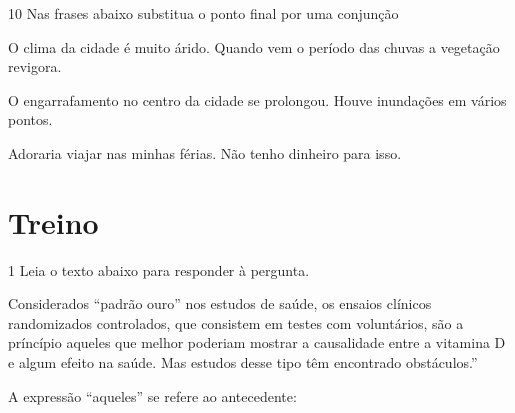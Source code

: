 {\num{10} Nas frases abaixo substitua o ponto final por uma conjunção

\begin{escolha}

  \item O clima da cidade é muito árido. Quando vem o período das chuvas a
  vegetação revigora.

\item{}
  
  \item O engarrafamento no centro da cidade se prolongou. Houve inundações em
  vários pontos.

\item{}
  
  \item Adoraria viajar nas minhas férias. Não tenho dinheiro para isso.

\item{}

\end{escolha}

\section{Treino}

\num{1} Leia o texto abaixo para responder à pergunta.

\begin{myquote}

Considerados ``padrão ouro'' nos estudos de saúde, os ensaios clínicos
randomizados controlados, que consistem em testes com voluntários, são a
príncípio aqueles que melhor poderiam mostrar a causalidade entre a
vitamina D e algum efeito na saúde. Mas estudos desse tipo têm
encontrado obstáculos.''

\end{myquote}


A expressão ``aqueles'' se refere ao antecedente:

\begin{escolha}


\end{escolha}}
